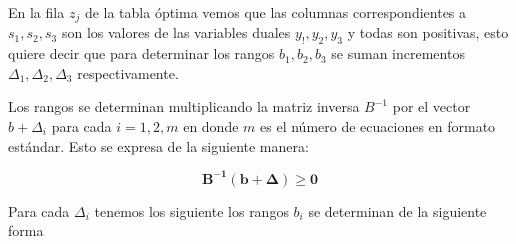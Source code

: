 \begin{solution}
  En la fila $z_j$ de la tabla óptima vemos que las columnas correspondientes a $s_1, s_2, s_3$ son los valores de las variables duales $y_!, y_2, y_3$ y todas son positivas, esto quiere decir que para determinar los rangos $b_1, b_2, b_3$ se suman incrementos $\Delta_1, \Delta_2, \Delta_3$ respectivamente.

  Los rangos se determinan multiplicando la matriz inversa $B^{-1}$ por el vector $b + \Delta_i$ para cada $i = 1, 2, m$ en donde $m$ es el número de ecuaciones en formato estándar. Esto se expresa de la siguiente manera:

  \[ \boldsymbol{B^{-1}} (\boldsymbol{b + \Delta}) \geq \boldsymbol{0}\]

  Para cada $\Delta_i$ tenemos los siguiente los rangos $b_i$ se determinan de la siguiente forma


\end{solution}
